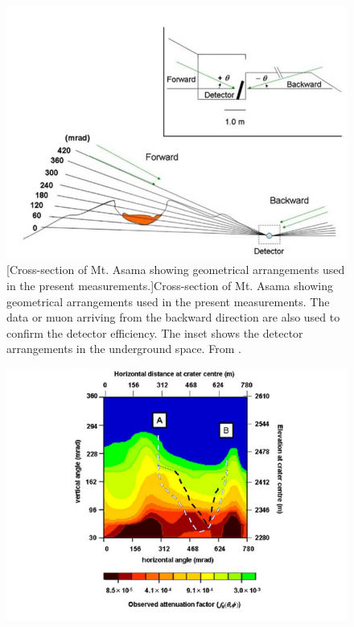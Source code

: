 \begin{figure}[!h]
\centering
\begin{minipage}{.45\textwidth}
  \centering
  \includegraphics[width=\linewidth]{Chapter5/Figs/MuTomographyExamples/MtAsma1dExplanation.png}
  [Cross-section of Mt. Asama showing geometrical arrangements used in the present measurements.]{Cross-section of Mt. Asama showing geometrical arrangements used in the present measurements. The data or muon arriving from the backward direction are also used to confirm the detector efficiency. The inset shows the detector arrangements in the underground space. From \cite{Tanaka_mtAsama_2007}.} 
  \label{fig:MtAsma1dExplanation}
\end{minipage}%
\qquad
\begin{minipage}{.45\textwidth}
  \centering
  \includegraphics[width=\linewidth]{Chapter5/Figs/MuTomographyExamples/mtAsama1DMuonTomography.png}

\end{minipage}
\end{figure}
